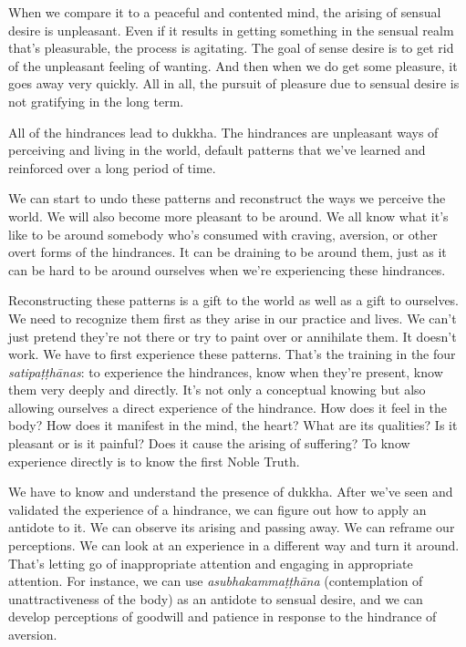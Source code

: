When we compare it to a peaceful and contented mind, the arising of sensual desire is unpleasant. Even if it results in getting something in the sensual realm that's pleasurable, the process is agitating. The goal of sense desire is to get rid of the unpleasant feeling of wanting. And then when we do get some pleasure, it goes away very quickly. All in all, the pursuit of pleasure due to sensual desire is not gratifying in the long term.

All of the hindrances lead to dukkha. The hindrances are unpleasant ways of perceiving and living in the world, default patterns that we've learned and reinforced over a long period of time.

We can start to undo these patterns and reconstruct the ways we perceive the world. We will also become more pleasant to be around. We all know what it's like to be around somebody who's consumed with craving, aversion, or other overt forms of the hindrances. It can be draining to be around them, just as it can be hard to be around ourselves when we're experiencing these hindrances.

Reconstructing these patterns is a gift to the world as well as a gift to ourselves. We need to recognize them first as they arise in our practice and lives. We can't just pretend they're not there or try to paint over or annihilate them. It doesn't work. We have to first experience these patterns. That's the training in the four \emph{satipaṭṭhānas}: to experience the hindrances, know when they're present, know them very deeply and directly. It's not only a conceptual knowing but also allowing ourselves a direct experience of the hindrance. How does it feel in the body? How does it manifest in the mind, the heart? What are its qualities? Is it pleasant or is it painful? Does it cause the arising of suffering? To know experience directly is to know the first Noble Truth.

We have to know and understand the presence of dukkha. After we've seen and validated the experience of a hindrance, we can figure out how to apply an antidote to it. We can observe its arising and passing away. We can reframe our perceptions. We can look at an experience in a different way and turn it around. That's letting go of inappropriate attention and engaging in appropriate attention. For instance, we can use \emph{asubhakammaṭṭhāna} (contemplation of unattractiveness of the body) as an antidote to sensual desire, and we can develop perceptions of goodwill and patience in response to the hindrance of aversion.

